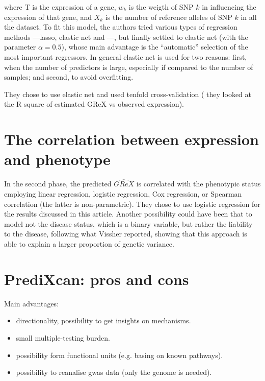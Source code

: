 \documentclass[../main.tex]{subfiles}
\begin{document}
where T is the expression of a gene, $w_k$ is the weigth of SNP $k$ in 
influencing the expression of that gene, and $X_k$ is the number of 
reference alleles of SNP $k$ in all the dataset. To fit this model, the 
authors tried various types of regression methods ---lasso, elastic net 
and ---, but finally settled to elastic net (with the 
parameter $\alpha = 0.5$), whose main advantage is the 
\enquote{automatic} selection of the most important regressors. In 
general elastic net is used for two reasons: first, when the number of 
predictors is large, especially if compared to the number of samples; 
and second, to avoid overfitting.

They chose to use elastic net and used tenfold cross-validation (\ie 
they looked at the R square of estimated GReX vs observed expression).

\section{The correlation between expression and phenotype}

In the second phase, the predicted $\hat{GReX}$ is correlated with the 
phenotypic status employing linear regression, logistic regression, Cox 
regression, or Spearman correlation (the latter is non-parametric). They 
chose to use logistic regression for the results discussed in this 
article. Another possibility could have been that to model not the 
disease status, which is a binary variable, but rather the liability to 
the disease, following what Vissher\cite{Visscher2008} reported, showing 
that this approach is able to explain a larger proportion of genetic 
variance.

\section{PrediXcan: pros and cons}

Main advantages:

\begin{itemize}
\item directionality, possibility to get insights on mechanisms.
\item small multiple-testing burden.
\item possibility form functional units (e.g. basing on known pathways).
\item possibility to reanalise gwas data (only the genome is needed).
\end{itemize}
\end{document}
